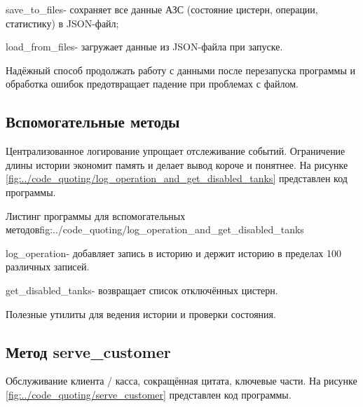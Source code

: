 \documentclass{vvsu}
\begin{document}
\begin{vvsu_itemize}
  \item save\_to\_files- сохраняет все данные АЗС (состояние цистерн, операции, статистику) в JSON-файл;
  \item load\_from\_files- загружает данные из JSON-файла при запуске.
\end{vvsu_itemize}
  
  Надёжный способ продолжать работу с данными после перезапуска программы и обработка ошибок предотвращает падение при проблемах с файлом.


\subsection{Вспомогательные методы}
  Централизованное логирование упрощает отслеживание событий. Ограничение длины истории экономит память и делает вывод короче и понятнее.
  На рисунке \ref{fig:../code_quoting/log_operation_and_get_disabled_tanks} представлен код программы.

\begin{vvsu_figure}{Листинг программы для вспомогательных методов}{fig:../code_quoting/log_operation_and_get_disabled_tanks}
  \begin{minipage}{.75\textwidth}
    
  \end{minipage}
\end{vvsu_figure}

\begin{vvsu_itemize}
  \item log\_operation- добавляет запись в историю и держит историю в пределах 100 различных записей.
  \item get\_disabled\_tanks- возвращает список отключённых цистерн.
\end{vvsu_itemize}
  
  Полезные утилиты для ведения истории и проверки состояния.


\subsection{Метод serve\_customer}
  Обслуживание клиента / касса, сокращённая цитата, ключевые части.
  На рисунке \ref{fig:../code_quoting/serve_customer} представлен код программы.
\end{document}
